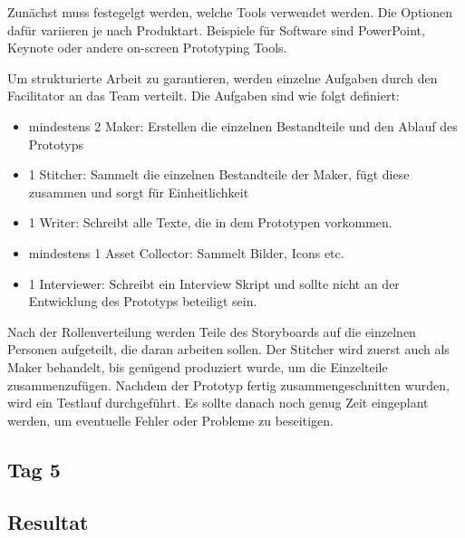 Zunächst muss festegelgt werden, welche Tools verwendet werden. Die Optionen dafür variieren je nach Produktart. Beispiele für Software sind PowerPoint, Keynote oder andere on-screen Prototyping Tools.

Um strukturierte Arbeit zu garantieren, werden einzelne Aufgaben durch den Facilitator an das Team verteilt. Die Aufgaben sind wie folgt definiert:
\begin{itemize}
	\item mindestens 2 Maker:
	Erstellen die einzelnen Bestandteile und den Ablauf des Prototyps
	\item 1 Stitcher:
	Sammelt die einzelnen Bestandteile der Maker, fügt diese zusammen und sorgt für Einheitlichkeit
	\item 1 Writer:
	Schreibt alle Texte, die in dem Prototypen vorkommen.
	\item mindestens 1 Asset Collector:
	Sammelt Bilder, Icons etc.
	\item 1 Interviewer:
	Schreibt ein Interview Skript und sollte nicht an der Entwicklung des Prototyps beteiligt sein.
\end{itemize}

Nach der Rollenverteilung werden Teile des Storyboards auf die einzelnen Personen aufgeteilt, die daran arbeiten sollen. Der Stitcher wird zuerst auch als Maker behandelt, bis genügend produziert wurde, um die Einzelteile zusammenzufügen. Nachdem der Prototyp fertig zusammengeschnitten wurden, wird ein Testlauf durchgeführt. Es sollte danach noch genug Zeit eingeplant werden, um eventuelle Fehler oder Probleme zu beseitigen.
\subsection*{Tag 5}

\subsection*{Resultat}
